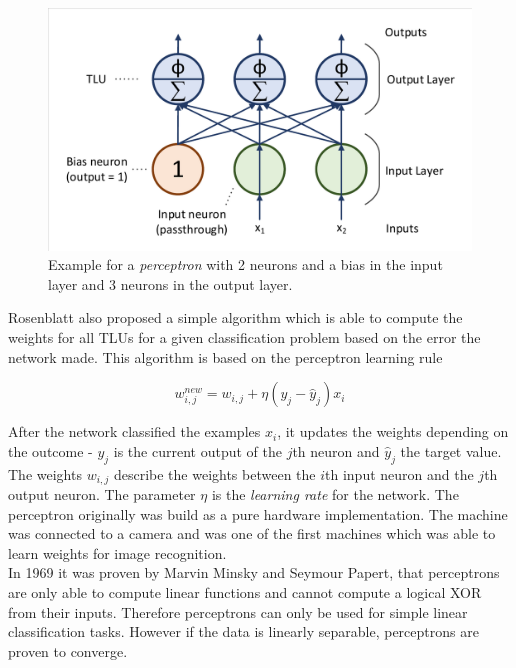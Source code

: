\begin{figure}[ht]
  
  \begin{center}
      \includegraphics[trim=10px 10px 10px 10px, clip, width=0.7\columnwidth]{figures/deeplearning/Perceptron.pdf}
  \end{center}
  
  \caption[Perceptron Example]{Example for a \textit{perceptron} with 2 neurons and a bias in the input layer and 3 neurons in the output layer.}
  \label{fig:Perceptron}
\end{figure}

Rosenblatt also proposed a simple algorithm which is able to compute the weights for all TLUs for a given classification problem based on the error the network made. This algorithm is based on the perceptron learning rule 

\[w_{i, j}^{new} = w_{i, j} + \eta(y_j - \hat{y}_j) x_i\]

After the network classified the examples $x_i$, it updates the weights depending on the outcome - $y_j$ is the current output of the $j$th neuron and $\hat{y}_j$ the target value. The weights $w_{i, j}$ describe the weights between the $i$th input neuron and the $j$th output neuron. The parameter $\eta$ is the \textit{learning rate} for the network. The perceptron originally was build as a pure hardware implementation. The machine was connected to a camera and was one of the first machines which was able to learn weights for image recognition. \\
In 1969 it was proven by Marvin Minsky and Seymour Papert, that perceptrons are only able to compute linear functions and cannot compute a logical XOR from their inputs. Therefore perceptrons can only be used for simple linear classification tasks. However if the data is linearly separable, perceptrons are proven to converge.

